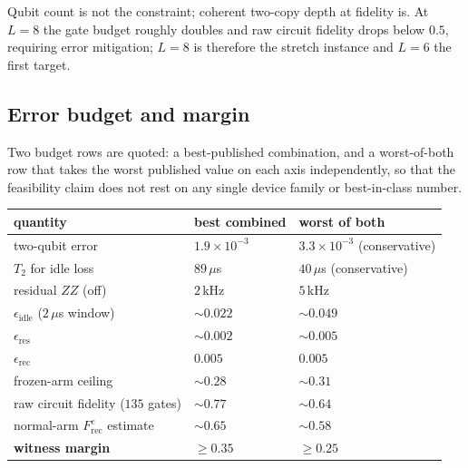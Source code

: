 \documentclass[11pt]{article}
\newcommand{\Frec}{F^{e}_{\mathrm{rec}}}
\begin{document}
Qubit count is not the constraint; coherent two-copy depth at
fidelity is.  At $L = 8$ the gate budget roughly doubles and raw
circuit fidelity drops below $0.5$, requiring error mitigation;
$L = 8$ is therefore the stretch instance and $L = 6$ the first
target.

\subsection{Error budget and margin}
\label{sec:budget}

Two budget rows are quoted: a best-published combination, and a
worst-of-both row that takes the worst published value on each axis
independently, so that the feasibility claim does not rest on any
single device family or best-in-class number.

\begin{center}
\begin{tabular}{@{}lll@{}}
\toprule
quantity & best combined & worst of both \\
\midrule
two-qubit error & $1.9\times 10^{-3}$ \citep{Marxer2023} &
  $3.3\times 10^{-3}$ (conservative\footnotemark) \\
$T_2$ for idle loss & $89\,\mu$s \citep{GoogleQEC2024} &
  $40\,\mu$s (conservative) \\
residual $ZZ$ (off) & $2$\,kHz \citep{Marxer2023} & $5$\,kHz \\
\midrule
$\epsilon_{\mathrm{idle}}$ ($2\,\mu$s window) & $\sim 0.022$ &
  $\sim 0.049$ \\
$\epsilon_{\mathrm{res}}$ & $\sim 0.002$ & $\sim 0.005$ \\
$\epsilon_{\mathrm{rec}}$ & $0.005$ & $0.005$ \\
frozen-arm ceiling & $\sim 0.28$ & $\sim 0.31$ \\
\midrule
raw circuit fidelity ($135$ gates) & $\sim 0.77$ & $\sim 0.64$ \\
normal-arm $\Frec$ estimate & $\sim 0.65$ & $\sim 0.58$ \\
\textbf{witness margin} & $\ge 0.35$ & $\ge 0.25$ \\
\bottomrule
\end{tabular}
\end{center}

\end{document}
